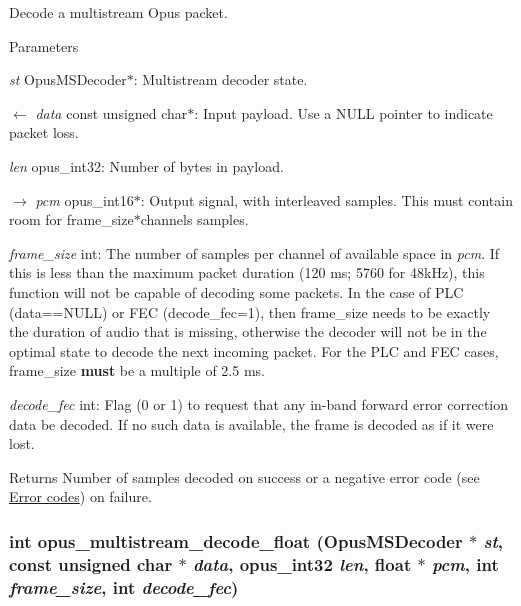Decode a multistream Opus packet. 
\begin{DoxyParams}{Parameters}
\item[{\em st}]{\ttfamily OpusMSDecoder$\ast$}: Multistream decoder state. \item[\mbox{$\leftarrow$} {\em data}]{\ttfamily const unsigned char$\ast$}: Input payload. Use a {\ttfamily NULL} pointer to indicate packet loss. \item[{\em len}]{\ttfamily opus\_\-int32}: Number of bytes in payload. \item[\mbox{$\rightarrow$} {\em pcm}]{\ttfamily opus\_\-int16$\ast$}: Output signal, with interleaved samples. This must contain room for {\ttfamily frame\_\-size$\ast$channels} samples. \item[{\em frame\_\-size}]{\ttfamily int}: The number of samples per channel of available space in {\itshape pcm\/}. If this is less than the maximum packet duration (120 ms; 5760 for 48kHz), this function will not be capable of decoding some packets. In the case of PLC (data==NULL) or FEC (decode\_\-fec=1), then frame\_\-size needs to be exactly the duration of audio that is missing, otherwise the decoder will not be in the optimal state to decode the next incoming packet. For the PLC and FEC cases, frame\_\-size {\bfseries must} be a multiple of 2.5 ms. \item[{\em decode\_\-fec}]{\ttfamily int}: Flag (0 or 1) to request that any in-\/band forward error correction data be decoded. If no such data is available, the frame is decoded as if it were lost. \end{DoxyParams}
\begin{DoxyReturn}{Returns}
Number of samples decoded on success or a negative error code (see \hyperlink{group__opus__errorcodes}{Error codes}) on failure. 
\end{DoxyReturn}
\hypertarget{group__opus__multistream_ga620e67c67872f8ea0b67a200c729630a}{
\subsubsection[{opus\_\-multistream\_\-decode\_\-float}]{\setlength{\rightskip}{0pt plus 5cm}int opus\_\-multistream\_\-decode\_\-float ({\bf OpusMSDecoder} $\ast$ {\em st}, \/  const unsigned char $\ast$ {\em data}, \/  {\bf opus\_\-int32} {\em len}, \/  float $\ast$ {\em pcm}, \/  int {\em frame\_\-size}, \/  int {\em decode\_\-fec})}}
\label{group__opus__multistream_ga620e67c67872f8ea0b67a200c729630a}


